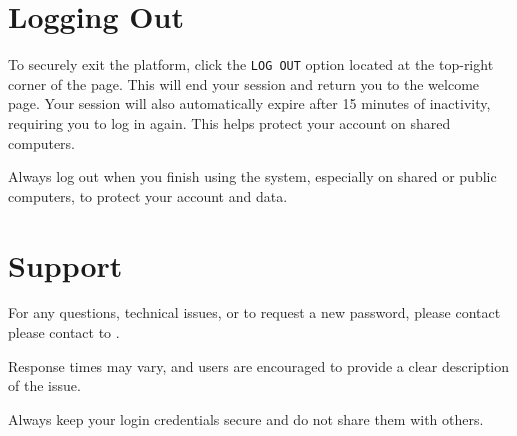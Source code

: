 \chapter{Logging Out} \label{chap:user-logout}

To securely exit the platform, click the \texttt{LOG OUT} option located at the top-right corner of the page. This will end your session and return you to the welcome page. Your session will also automatically expire after 15 minutes of inactivity, requiring you to log in again. This helps protect your account on shared computers.

Always log out when you finish using the system, especially on shared or public computers, to protect your account and data.


\chapter{Support} \label{chap:user-support}

For any questions, technical issues, or to request a new password, please contact please contact to \prjUrl. 

Response times may vary, and users are encouraged to provide a clear description of the issue. 

Always keep your login credentials secure and do not share them with others.



